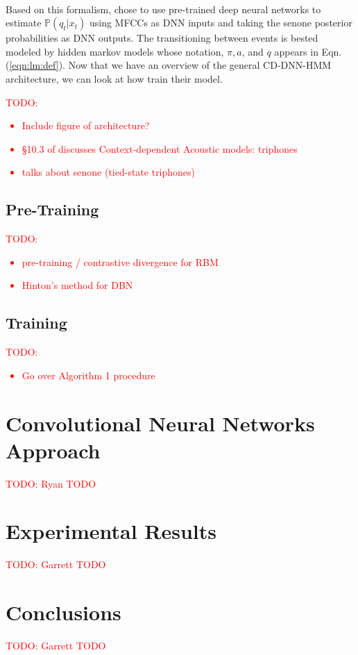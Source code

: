 \documentclass[letterpaper]{article}
\newcommand{\TODO}[1]{\textcolor{red}{TODO: #1}}
\newcommand{\cprob}[2]{ \prob{#1 \lvert #2} }
\newcommand{\prob}[1]{\mathbb{P}\left( #1 \right)}
\begin{document}
\paragraph{} Based on this formalism, \cite{DBLP:journals/taslp/DahlYDA12} chose to use pre-trained deep neural networks to estimate $\cprob{q_t}{x_t}$ using MFCCs as DNN inputs and taking the senone posterior probabilities as DNN outputs. The transitioning between events is bested modeled by hidden markov models whose notation, $\pi, a$, and $q$ appears in Eqn. (\ref{eqn:lm:def}). Now that we have an overview of the general CD-DNN-HMM architecture, we can look at how \cite{DBLP:journals/taslp/DahlYDA12} train their model.

\TODO{\begin{itemize}
	\item Include figure of architecture?
	\item \S 10.3 of \cite{jurafskyMartin} discusses Context-dependent Acoustic models: triphones
	\item \cite{DBLP:conf/interspeech/2014} talks about senone (tied-state triphones)
\end{itemize}}

\subsection*{Pre-Training}

\TODO{\begin{itemize}
	\item pre-training / contrastive divergence for RBM
	\item Hinton's method for DBN
\end{itemize}}


\subsection*{Training}

\TODO{\begin{itemize}
	\item Go over Algorithm 1 procedure
\end{itemize}}

\section*{Convolutional Neural Networks Approach} \TODO{Ryan TODO}

\section*{Experimental Results} \TODO{Garrett TODO}

\section*{Conclusions} \TODO{Garrett TODO}

\appendix

\singlespacing



\end{document}
